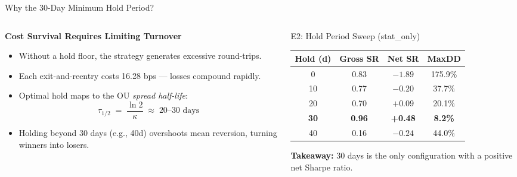 \documentclass[aspectratio=169,10pt]{beamer}
\begin{document}
\begin{frame}{Why the 30-Day Minimum Hold Period?}
  \begin{columns}[T]
    \begin{column}{0.54\textwidth}
      \textbf{Cost Survival Requires Limiting Turnover}
      \begin{itemize}\itemsep4pt
        \item Without a hold floor, the strategy generates excessive round-trips.
        \item Each exit-and-reentry costs 16.28 bps --- losses compound rapidly.
        \item Optimal hold maps to the OU \emph{spread half-life}:
        \[
          \tau_{1/2} \;=\; \frac{\ln 2}{\kappa} \;\approx\; 20\text{--}30\text{ days}
        \]
        \item Holding beyond 30 days (e.g., 40d) overshoots mean reversion, turning winners into losers.
      \end{itemize}
    \end{column}
    \begin{column}{0.43\textwidth}
      \begin{block}{E2: Hold Period Sweep (stat\_only)}
        \centering\scriptsize
        \renewcommand{\arraystretch}{1.25}
        \begin{tabular}{cccc}
          \toprule
          \textbf{Hold (d)} & \textbf{Gross SR} & \textbf{Net SR} & \textbf{MaxDD} \\
          \midrule
          0  & 0.83 & $-1.89$ & 175.9\% \\
          10 & 0.77 & $-0.20$ & 37.7\%  \\
          20 & 0.70 & $+0.09$ & 20.1\%  \\
          \rowcolor{hlrow}\textbf{30} & \textbf{0.96}
               & \textbf{\color{goodgreen}+0.48} & \textbf{8.2\%} \\
          40 & 0.16 & $-0.24$ & 44.0\%  \\
          \bottomrule
        \end{tabular}
      \end{block}
      \vspace{5pt}
      \small\textbf{Takeaway:} 30 days is the \alert{only configuration} with a positive net Sharpe ratio.
    \end{column}
  \end{columns}
\end{frame}

\end{document}
